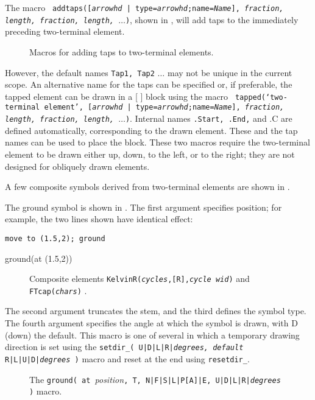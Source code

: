 The macro {\tt
    addtaps([{\sl arrowhd} | type={\sl arrowhd};name={\sl Name}],
    {\sl fraction, length, fraction, length,}
    $\ldots$)},
shown in , will add taps to the
immediately preceding two-terminal element.
\begin{figure}[h!t]
   
   \caption{Macros for adding taps to two-terminal elements.}
   \label{Taps}
   \end{figure}
However, the default names
{\tt Tap1, Tap2} $\ldots$ may not be unique in the current scope.  An
alternative name for the taps can be specified or, if preferable, the
tapped element can be drawn in a [ ] block using the macro {\tt
  tapped(`{\sl two-terminal element}',
  [{\sl arrowhd} | type={\sl arrowhd};name={\sl Name}],
    {\sl fraction, length, fraction, length,} $\ldots$)}.
   Internal names {\tt .Start, .End,} and {.C} are defined automatically,
   corresponding to the drawn element. These and the tap names can be used
   to place the block.
These two macros require the two-terminal element to be drawn either up,
down, to the left, or to the right; they are not designed for obliquely
drawn elements.

A few composite symbols derived from two-terminal elements
are shown in .

The ground symbol is shown in .
The first argument specifies position; for example, the two lines shown
have identical effect:
\par
{\tt move to (1.5,2); ground
\par
ground(at (1.5,2)) }

\begin{figure}[h!t]
   \vspace*{-0.5ex}
   
   \vspace*{-0.5ex}
   \caption{Composite elements {\tt KelvinR({\sl cycles},[R],{\sl cycle wid})}
      and {\tt FTcap({\sl chars})} .}
   \label{Composite}
   \end{figure}

The second argument truncates
the stem, and the third defines the symbol type.
The fourth argument specifies the angle at which the symbol is drawn,
with D (down) the default.
This macro is one of several in which a temporary drawing direction
is set using the
 {\tt setdir\_( U|D|L|R|{\sl degrees, default} R|L|U|D|{\sl degrees} )}
macro and reset at the end using {\tt resetdir\_}.
\begin{figure}[ht!]
   
   \caption{The 
     {\tt ground( at }{\sl position}{\tt,
       T, N|F|S|L|P[A]|E, U|D|L|R|{\sl degrees} )}
     macro.}
   \label{Grounds}
   \end{figure}

